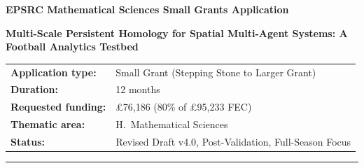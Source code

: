 \documentclass[11pt,a4paper]{article}
\begin{document}
\begin{center}
  {\Large\bfseries EPSRC Mathematical Sciences Small Grants Application\par}
  \vspace{0.75em}
  {\large\bfseries Multi-Scale Persistent Homology for Spatial Multi-Agent Systems: A Football Analytics Testbed\par}
  \vspace{1em}
  \begin{tabular}{@{}ll@{}}
    \textbf{Application type:} & Small Grant (Stepping Stone to Larger Grant) \\
    \textbf{Duration:} & 12 months \\
    \textbf{Requested funding:} & \pounds76{,}186 (80\% of \pounds95{,}233 FEC) \\
    \textbf{Thematic area:} & H.\ Mathematical Sciences \\
    \textbf{Status:} & Revised Draft v4.0, Post-Validation, Full-Season Focus \\
  \end{tabular}
\end{center}

\vspace{1.5em}
\hrule
\vspace{1.25em}












\end{document}
